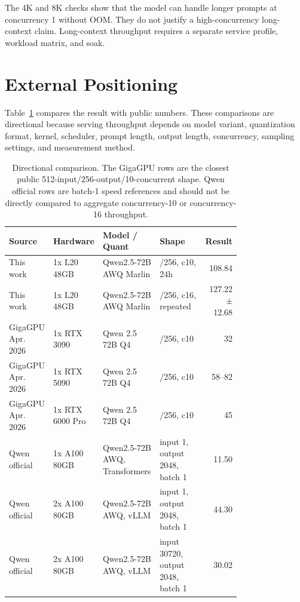 \documentclass[11pt]{article}
\newcommand{\qwenbase}{Qwen2.5\nobreakdash-72B}
\begin{document}
The 4K and 8K checks show that the model can handle longer prompts at
concurrency 1 without OOM. They do not justify a high-concurrency long-context
claim. Long-context throughput requires a separate service profile, workload
matrix, and soak.

\section{External Positioning}

Table~\ref{tab:external} compares the result with public numbers. These
comparisons are directional because serving throughput depends on model variant,
quantization format, kernel, scheduler, prompt length, output length,
concurrency, sampling settings, and measurement method.

\begin{table}[h]
\centering
\scriptsize
\setlength{\tabcolsep}{3pt}
\begin{tabular}{>{\raggedright\arraybackslash}p{0.14\linewidth}
                >{\raggedright\arraybackslash}p{0.13\linewidth}
                >{\raggedright\arraybackslash}p{0.25\linewidth}
                >{\raggedright\arraybackslash}p{0.25\linewidth}
                r}
\toprule
Source & Hardware & Model / Quant & Shape & Result \\
\midrule
This work & 1x L20 48GB & \qwenbase{} AWQ Marlin & 512/256, c10, 24h & 108.84 \\
This work & 1x L20 48GB & \qwenbase{} AWQ Marlin & 512/256, c16, repeated & 127.22 $\pm$ 12.68 \\
GigaGPU Apr. 2026 & 1x RTX 3090 & Qwen 2.5 72B Q4 & 512/256, c10 & 32 \\
GigaGPU Apr. 2026 & 1x RTX 5090 & Qwen 2.5 72B Q4 & 512/256, c10 & 58--82 \\
GigaGPU Apr. 2026 & 1x RTX 6000 Pro & Qwen 2.5 72B Q4 & 512/256, c10 & 45 \\
Qwen official & 1x A100 80GB & \qwenbase{} AWQ, Transformers & input 1, output 2048, batch 1 & 11.50 \\
Qwen official & 2x A100 80GB & \qwenbase{} AWQ, vLLM & input 1, output 2048, batch 1 & 44.30 \\
Qwen official & 2x A100 80GB & \qwenbase{} AWQ, vLLM & input 30720, output 2048, batch 1 & 30.02 \\
\bottomrule
\end{tabular}
\caption{Directional comparison. The GigaGPU rows are the closest public
512-input/256-output/10-concurrent shape. Qwen official rows are batch-1 speed
references and should not be directly compared to aggregate concurrency-10 or
concurrency-16 throughput.}
\label{tab:external}
\end{table}
\end{document}
